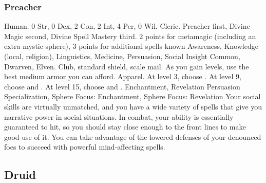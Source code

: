         \subsubsection{Preacher}
             Human.
             0 Str, 0 Dex, 2 Con, 2 Int, 4 Per, 0 Wil.
             Cleric.
             Preacher first, Divine Magic second, Divine Spell Mastery third.
             2 points for metamagic (including an extra mystic sphere), 3 points for additional spells known
             Awareness, Knowledge (local, religion), Linguistics, Medicine, Persuasion, Social Insight
             Common, Dwarven, Elven.
             Club, standard shield, scale mail. As you gain levels, use the best medium armor you can afford.
             Apparel.
                At level 3, choose .
                At level 9, choose  and .
                At level 15, choose  and .
             Enchantment, Revelation
             Persuasion Specialization, Sphere Focus: Enchantment, Sphere Focus: Revelation
             Your social skills are virtually unmatched, and you have a wide variety of spells that give you narrative power in social situations.
            In combat, your  ability is essentially guaranteed to hit, so you should stay close enough to the front lines to make good use of it.
            You can take advantage of the lowered defenses of your denounced foes to succeed with powerful mind-affecting spells.

    \subsection{Druid}

